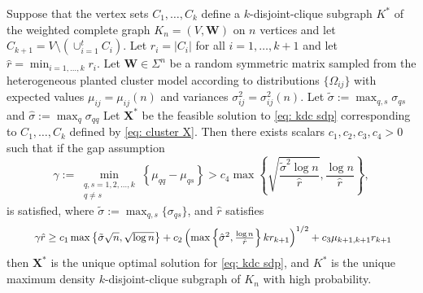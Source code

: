 \documentclass[twoside,11pt]{article}
\newcommand{\bs}{\boldsymbol}
\newcommand{\X}{\bs {X}}
\newcommand{\0}{\bs{0}}
\newcommand{\rbra}[1]{\ensuremath{\left( #1 \right)}} %
\newcommand{\bra}[1]{\ensuremath{\left\{ #1 \right\}}} %
\newcommand{\kdc}{\(k\)-disjoint-clique }
\begin{document}
{\begin{theorem} \label{thm: rec}
	Suppose that the vertex sets \(C_1,\dots,C_k\) define a \(k\)-disjoint-clique subgraph \(K^*\) of the weighted
	complete graph
	\(K_n = (V,\bs W)\) on \(n\) vertices and let \(C_{k+1} = V \setminus \left(\cup_{i=1}^t C_i \right)\). Let \(r_i = |C_i|\) for all
	\(i=1,\dots,k+1\) and let \(\hat{r} = \min_{i=1,\dots,k} r_i\).
	Let \(\bs{W} \in \Sigma^n\)
	be a random symmetric matrix sampled from the heterogeneous planted cluster model according to distributions \(\{\Omega_{ij} \}\) with expected values \(\mu_{ij} = \mu_{ij}(n)\) and variances
	\(\sigma_{ij}^2 = \sigma_{ij}^2(n)\).
	Let $\tilde \sigma := \max_{q,s} \sigma_{qs}$ and
	$\hat \sigma := \max_{q} \sigma_{qq}$
	Let \(\X^*\) be the feasible solution to \eqref{eq: kdc sdp} corresponding to \(C_1,\dots,C_k\) defined by
	\eqref{eq: cluster X}. Then there exists scalars \(c_1, c_2, c_3, c_4 > 0\) such that if
	the gap assumption
	\begin{equation}
	\label{eq:brendan_27_mod}
		\gamma := \min_{\substack{q,s=1,2,\dots, k \\ q\neq s}} \bra{\mu_{qq} - \mu_{qs}}
		> c_4 \max \bra{ \sqrt{  \frac{\tilde \sigma^2 \log n }{\hat r} },
		\frac{\log n }{\hat r} },
	\end{equation}
		is satisfied,
		where $\tilde \sigma := \max_{q,s}\{ \sigma_{qs}\}$,
		and $\hat r$ satisfies
	\begin{equation}\label{eq:smallest_largest}
	\resizebox{0.92\textwidth}{!}{
		\(
		\gamma \hat r \ge %
		{  c_1 \max\left\lbrace \tilde\sigma\sqrt{n},  \sqrt{\log n} \right\rbrace
			+ c_2 \rbra{ \max \bra{\hat\sigma^2, \frac{\log n}{\hat r} } k r_{k+1} }^{1/2} + c_3 \mu_{k+1, k+1} r_{k+1} }		\)}
	\end{equation}
	then \(\bs{X}^*\) is the unique optimal solution for \eqref{eq: kdc sdp}, and \(K^*\) is the unique maximum density \kdc
	subgraph of \(K_n\) with high probability.
\end{theorem}
%

}
\end{document}
